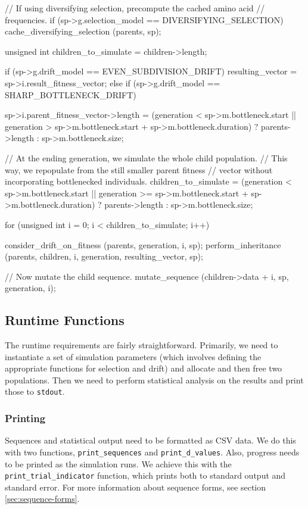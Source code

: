 \documentclass{article}
\begin{document}
\begin{ccode}
{  // If using diversifying selection, precompute the cached amino acid
  // frequencies.
  if (sp->g.selection_model == DIVERSIFYING_SELECTION)
    cache_diversifying_selection (parents, sp);

  unsigned int children_to_simulate = children->length;

  if (sp->g.drift_model == EVEN_SUBDIVISION_DRIFT)
    resulting_vector = sp->i.result_fitness_vector;
  else if (sp->g.drift_model == SHARP_BOTTLENECK_DRIFT) {
    sp->i.parent_fitness_vector->length = (generation < sp->m.bottleneck.start ||
					   generation > sp->m.bottleneck.start +
							sp->m.bottleneck.duration) ?
					  parents->length :
					  sp->m.bottleneck.size;
    
    // At the ending generation, we simulate the whole child population.
    // This way, we repopulate from the still smaller parent fitness
    // vector without incorporating bottlenecked individuals.
    children_to_simulate = (generation < sp->m.bottleneck.start ||
			    generation >= sp->m.bottleneck.start +
					  sp->m.bottleneck.duration) ?
			   parents->length :
			   sp->m.bottleneck.size;
  }

  for (unsigned int i = 0; i < children_to_simulate; i++) {
    consider_drift_on_fitness (parents, generation, i, sp);
    perform_inheritance (parents, children, i, generation, resulting_vector, sp);

    // Now mutate the child sequence.
    mutate_sequence (children->data + i, sp, generation, i);
  }
}
\end{ccode}

    \subsection{Runtime Functions}

      The runtime requirements are fairly straightforward. Primarily, we need to
      instantiate a set of simulation parameters (which involves defining the
      appropriate functions for selection and drift) and allocate and then free
      two populations. Then we need to perform statistical analysis on the
      results and print those to \verb|stdout|.

      \subsubsection{Printing}

	Sequences and statistical output need to be formatted as CSV data. We do
	this with two functions, \verb|print_sequences| and
	\verb|print_d_values|. Also, progress needs to be printed as the
	simulation runs. We achieve this with the \verb|print_trial_indicator|
	function, which prints both to standard output and standard error. For
	more information about sequence forms, see section
	\ref{sec:sequence-forms}.
\end{document}
